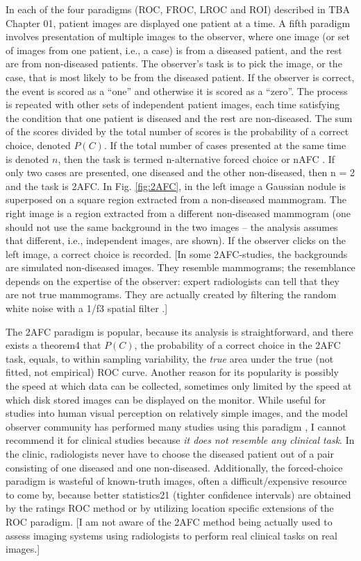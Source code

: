 \documentclass[
]{book}
\begin{document}
In each of the four paradigms (ROC, FROC, LROC and ROI) described in TBA Chapter 01, patient images are displayed one patient at a time. A fifth paradigm involves presentation of multiple images to the observer, where one image (or set of images from one patient, i.e., a case) is from a diseased patient, and the rest are from non-diseased patients. The observer's task is to pick the image, or the case, that is most likely to be from the diseased patient. If the observer is correct, the event is scored as a ``one'' and otherwise it is scored as a ``zero''. The process is repeated with other sets of independent patient images, each time satisfying the condition that one patient is diseased and the rest are non-diseased. The sum of the scores divided by the total number of scores is the probability of a correct choice, denoted \(P(C)\). If the total number of cases presented at the same time is denoted \(n\), then the task is termed n-alternative forced choice or nAFC \citep{green1966signal}. If only two cases are presented, one diseased and the other non-diseased, then n = 2 and the task is 2AFC. In Fig. \ref{fig:2AFC}, in the left image a Gaussian nodule is superposed on a square region extracted from a non-diseased mammogram. The right image is a region extracted from a different non-diseased mammogram (one should not use the same background in the two images -- the analysis assumes that different, i.e., independent images, are shown). If the observer clicks on the left image, a correct choice is recorded. {[}In some 2AFC-studies, the backgrounds are simulated non-diseased images. They resemble mammograms; the resemblance depends on the expertise of the observer: expert radiologists can tell that they are not true mammograms. They are actually created by filtering the random white noise with a 1/f3 spatial filter \citep{burgess2011visual}.{]}

The 2AFC paradigm is popular, because its analysis is straightforward, and there exists a theorem4 that \(P(C)\), the probability of a correct choice in the 2AFC task, equals, to within sampling variability, the \emph{true} area under the true (not fitted, not empirical) ROC curve. Another reason for its popularity is possibly the speed at which data can be collected, sometimes only limited by the speed at which disk stored images can be displayed on the monitor. While useful for studies into human visual perception on relatively simple images, and the model observer community has performed many studies using this paradigm \citep{RN1067}, I cannot recommend it for clinical studies because \emph{it does not resemble any clinical task}. In the clinic, radiologists never have to choose the diseased patient out of a pair consisting of one diseased and one non-diseased. Additionally, the forced-choice paradigm is wasteful of known-truth images, often a difficult/expensive resource to come by, because better statistics21 (tighter confidence intervals) are obtained by the ratings ROC method or by utilizing location specific extensions of the ROC paradigm. {[}I am not aware of the 2AFC method being actually used to assess imaging systems using radiologists to perform real clinical tasks on real images.{]}
\end{document}
